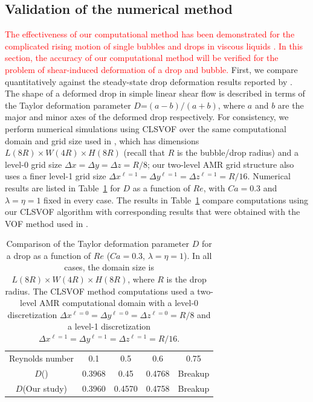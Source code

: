 \documentclass{elsarticle}
\newcommand{\lwh}[3]{L(#1R)\times W(#2R) \times H(#3R)}
\begin{document}
\subsection{Validation of the numerical method}
\textcolor{red}
{
The effectiveness of our computational method has been demonstrated for the complicated rising motion of single bubbles and drops in viscous liquids \citet{OhtSus12, OhtAkaYosSus14, OhtFurYosSus19}.  In this section, the accuracy of our computational method will be verified for the problem of shear-induced deformation of a drop and bubble. 
}
First, we compare quantitatively against the steady-state drop deformation results reported by \citet{LiRenRen00}.  The shape of a deformed drop in simple linear shear flow is described in terms of the Taylor deformation parameter $D$=$(a-b)/(a+b)$, where $a$ and $b$ are the major and minor axes of the deformed drop respectively.  For consistency, we perform numerical simulations using CLSVOF over the same computational domain and grid size used in \citet{LiRenRen00}, which has dimensions $\lwh{8}{4}{8}$ (recall that $R$ is the bubble/drop radius) and a level-0 grid size $\Delta x=\Delta y=\Delta z=R/8$; our two-level AMR grid structure also uses a finer level-1 grid size $\Delta x^{\ell=1} = \Delta y^{\ell=1} = \Delta z^{\ell=1} = R/16$.  Numerical results are listed in Table~\ref{tab:DeComparison} for $D$ as a function of $Re$, with $Ca=0.3$ and $\lambda = \eta = 1$ fixed in every case.  The results in Table~\ref{tab:DeComparison} compare computations using our CLSVOF algorithm with corresponding results that were obtained with the VOF method used in \citet{LiRenRen00}.  
%
\begin{table}[tbh]
\caption{Comparison of the Taylor deformation parameter $D$ for a drop as a function of $Re$ ($Ca=0.3$, $\lambda = \eta = 1$). In all cases, the domain size is $\lwh{8}{4}{8}$, where $R$ is the drop radius.  The CLSVOF method computations used a two-level AMR computational domain with a level-0 discretization $\Delta x^{\ell=0} = \Delta y^{\ell=0} = \Delta z^{\ell=0} = R/8$ and a level-1 discretization $\Delta x^{\ell=1} = \Delta y^{\ell=1} = \Delta z^{\ell=1} = R/16$.}
\label{tab:DeComparison}
\center
\begin{tabular}{ c  c  c  c  c }
\hline
\hline
Reynolds number                      & 0.1     & 0.5     & 0.6     & 0.75      \\
$D$(\citet{LiRenRen00})  & 0.3968  & 0.45    & 0.4768  & Breakup   \\
$D$(Our study) & 0.3960  & 0.4570  & 0.4758  & Breakup   \\
\hline
\hline
\end{tabular}
\end{table}
\end{document}
